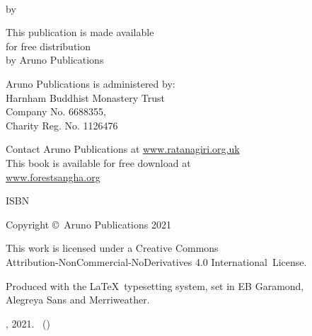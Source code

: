 \cleartoverso
\thispagestyle{empty}

{\copyrightsize
\setlength{\parindent}{0pt}%
\setlength{\parskip}{0.8\baselineskip}%

\thetitle\\
by \theauthor

This publication is made available\\
for free distribution\\
by Aruno Publications

Aruno Publications is administered by:\\
Harnham Buddhist Monastery Trust\\
Company No. 6688355,\\
Charity Reg. No. 1126476

Contact Aruno Publications at \href{https://ratanagiri.org.uk/}{www.ratanagiri.org.uk}\\
This book is available for free download at\\
\href{https://forestsangha.org/}{www.forestsangha.org}

ISBN \theISBN

Copyright \copyright\ Aruno Publications 2021

\vfill

{\footnotesize

This work is licensed under a Creative Commons\\
Attribution-NonCommercial-NoDerivatives 4.0 International~License.

Produced with the \LaTeX\ typesetting system, set in EB Garamond,\\
Alegreya Sans and Merriweather.

\ifdesktopversion
\textit{\theDigitalEditionInfo}, 2021.
\else
\theEditionInfo\ (\theDigitalEditionInfo)
\fi

}}
